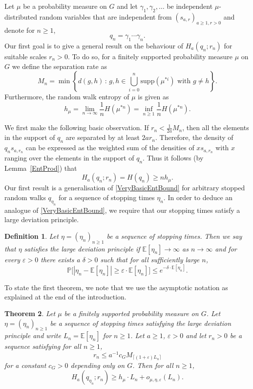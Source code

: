 \documentclass[10pt, english,oneside,reqno]{amsart}
\theoremstyle{plain}
\newtheorem{theorem}{Theorem}[section]
\newtheorem{definition}[theorem]{Definition}
\theoremstyle{remark}
\numberwithin{equation}{section}
\numberwithin{figure}{section}
\newcommand{\eps}{\varepsilon}
\newcommand{\E}{\mathbb{E}}
\begin{document}
    Let $\mu$ be a probability measure on $G$ and let $\gamma_1, \gamma_2, \ldots$ be independent $\mu$-distributed random variables that are independent from $(s_{a,r})_{a \geq 1, r > 0}$ and denote for $n\geq 1$, $$q_n = \gamma_1 \cdots \gamma_n.$$ Our first goal is to give a general result on the behaviour of $H_a(q_n; r_n)$ for suitable scales $r_n > 0$. To do so, for a finitely supported probability measure $\mu$ on $G$ we define the separation rate as $$M_n = \min\left\{ d(g,h) \,:\, g,h \in \bigcup_{i = 0}^n \mathrm{supp}(\mu^{*i}) \text{ with } g\neq h \right\}.$$ Furthermore, the random walk entropy of $\mu$ is given as $$h_{\mu} = \lim_{n \to \infty} \frac{1}{n}H(\mu^{*n}) = \inf_{n \geq 1} \frac{1}{n}
    H(\mu^{*n}).$$

    We first make the following basic observation. If $r_n < \frac{1}{2a}M_n$, then all the elements in the support of $q_n$ are separated by at least $2ar_n$. Therefore, the density of $q_n s_{a, r_n}$ can be expressed as the weighted sum of the densities of $xs_{a, r_n}$ with $x$ ranging over the elements in the support of $q_n$. Thus it follows (by Lemma~\ref{EntProd}) that
    \begin{equation}\label{VeryBasicEntBound}
        H_a(q_n; r_n) = H(q_n) \geq n h_{\mu}.
    \end{equation}
    Our first result is a generalisation of \eqref{VeryBasicEntBound} for arbitrary stopped random walks $q_{\eta_n}$ for a sequence of stopping times $\eta_n$. In order to deduce an analogue of \eqref{VeryBasicEntBound}, we require that our stopping times satisfy a large deviation principle. 

\begin{definition}\label{EtaLDPDef}
    Let $\eta = (\eta_n)_{n \geq 1}$ be a sequence of stopping times. Then we say that $\eta$ satisfies the large deviation  principle if $\E[\eta_n] \to \infty$ as $n \to \infty$ and for every $\eps > 0$ there exists a $\delta > 0$ such that for all sufficiently large $n$, $$\mathbb{P}\big[|\eta_n - \mathbb{E}[  \eta_n]| \geq \eps \cdot  \mathbb{E}[ \eta_n] \big] \leq e^{-\delta \cdot \mathbb{E}[\eta_n]}.$$
\end{definition}

To state the first theorem, we note that we use the asymptotic notation as explained at the end of the introduction. 

\begin{theorem}\label{StoppedRWHighEnt} Let $\mu$ be a finitely supported probability measure on $G$. Let $\eta = (\eta_n)_{n \geq 1}$ be a sequence of stopping times satisfying the large deviation principle and write $L_n = \mathbb{E}[\eta_n]$ for $n\geq 1$. Let $a \geq 1$, $\eps > 0$ and let $r_n > 0$ be a sequence satisfying for all $n\geq 1$, $$r_n \leq a^{-1}c_G M_{\lceil (1 + \eps)L_n \rceil}$$ for a constant $c_G > 0$ depending only on $G$. Then for all $n \geq 1$, 
	$$H_a(q_{\eta_{n}} ; r_n) \geq h_{\mu}\cdot L_n + o_{\mu,\eta,\eps}(L_n).$$
\end{theorem}
\end{document}
